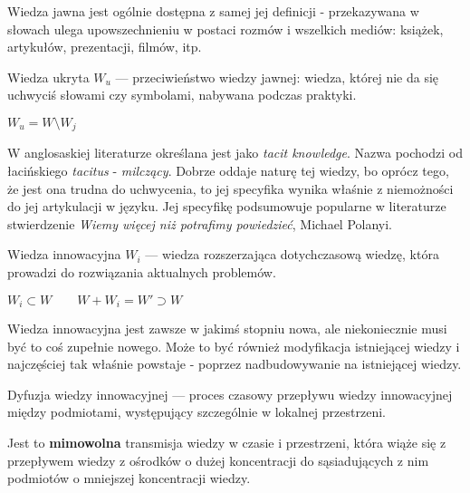 Wiedza jawna jest ogólnie dostępna z samej jej definicji - przekazywana
w słowach ulega upowszechnieniu w postaci rozmów i wszelkich mediów: 
książek, artykułów, prezentacji, filmów, itp. 

\begin{defi}
Wiedza ukryta $W_u$ --- przeciwieństwo wiedzy jawnej:
wiedza, której nie da się uchwyciś słowami czy symbolami,
nabywana podczas praktyki.
\begin{center}
\begin{math}
W_u = W \setminus W_j
\end{math}
\end{center}
\end{defi}

W anglosaskiej literaturze określana jest jako \textit{tacit knowledge}.
Nazwa pochodzi od łacińskiego \textit{tacitus} - \textit{milczący}.
Dobrze oddaje naturę tej wiedzy, bo oprócz tego, że jest ona
trudna do uchwycenia, to jej specyfika wynika właśnie z niemożności
do jej artykulacji w języku. Jej specyfikę podsumowuje popularne 
w literaturze stwierdzenie \textit{Wiemy więcej niż potrafimy powiedzieć}, 
Michael Polanyi.

\begin{defi}
Wiedza innowacyjna $W_i$ --- wiedza rozszerzająca dotychczasową
wiedzę, która prowadzi do rozwiązania aktualnych problemów.
\begin{center}
\begin{math}
W_i \subset W\qquad
W + W_i = W' \supset W
\end{math}
\end{center}
\end{defi}

Wiedza innowacyjna jest zawsze w jakimś stopniu nowa, ale
niekoniecznie musi być to coś zupełnie nowego. Może to być
również modyfikacja istniejącej wiedzy i najczęściej tak
właśnie powstaje - poprzez nadbudowywanie na istniejącej wiedzy.

\begin{defi}
Dyfuzja wiedzy innowacyjnej --- proces czasowy przepływu 
wiedzy innowacyjnej między podmiotami, występujący szczególnie
w lokalnej przestrzeni.
\end{defi}

Jest to \textbf{mimowolna} transmisja wiedzy w czasie i przestrzeni,
która wiąże się z przepływem wiedzy z ośrodków o dużej
koncentracji do sąsiadujących z nim podmiotów o mniejszej
koncentracji wiedzy.

